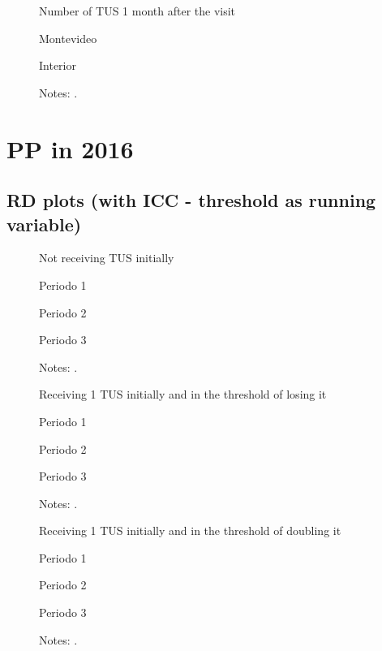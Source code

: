 \documentclass[12pt]{article}
\begin{document}
\begin{figure}[H]%
	\caption{Number of TUS 1 month after the visit}%
	\centering
	\caption*{ {Montevideo}}
	\qquad
	\caption*{Interior}
	\label{fig:first_stage_2018_tus1}%
	\caption*{ {\footnotesize Notes: .}}
\end{figure}

\section{PP in 2016}

\subsection{RD plots (with ICC - threshold as running variable)}
\begin{figure}[H]%
	\caption{Not receiving TUS initially}%
	\centering
	\caption*{ {Periodo 1}}
	\caption*{Periodo 2}
	\qquad
	\caption*{Periodo 3}
	\label{fig:pp2016_prim_0TUS.png}%
	\caption*{ {\footnotesize Notes: .}}
\end{figure}

\begin{figure}[H]%
	\caption{Receiving 1 TUS initially and in the threshold of losing it}%
	\centering
	\caption*{ {Periodo 1}}
	\qquad
	\caption*{Periodo 2}
	\qquad
	\caption*{Periodo 3}
	\label{fig:pp2016_prim_1TUS.png}%
	\caption*{ {\footnotesize Notes: .}}
\end{figure}

\begin{figure}[H]%
	\caption{Receiving 1 TUS initially and in the threshold of doubling it}%
	\centering
	\caption*{ {Periodo 1}}
	\qquad
	\caption*{Periodo 2}
	\qquad
	\caption*{Periodo 3}
	\label{fig:pp2016_seg_1TUS.png}%
	\caption*{ {\footnotesize Notes: .}}
\end{figure}
\end{document}
